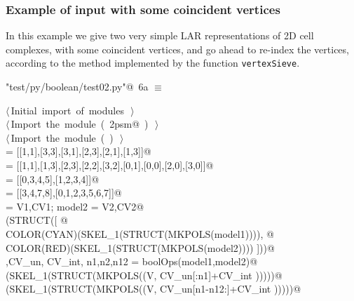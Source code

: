 \documentclass[11pt,oneside]{article}	%
\begin{document}
\subsubsection{Example of input with some coincident vertices}
In this example we give two very simple LAR representations of 2D cell complexes, with some coincident vertices, and go ahead to re-index the vertices, according to the method implemented by the function \texttt{vertexSieve}.

\begin{flushleft} \small
\begin{minipage}{\linewidth} \label{scrap9}
\protect{}\verb@"test/py/boolean/test02.py"@\nobreak\ {\footnotesize 6a }$\equiv$
\vspace{-1ex}
\begin{list}{}{} \item
\mbox{}\verb@@\hbox{$\langle\,$Initial import of modules\nobreak\ {\footnotesize {}}$\,\rangle$}\verb@@\\
\mbox{}\verb@@\hbox{$\langle\,$Import the module\nobreak\ ({\footnotesize {}\label{scrap10}
 }\mbox{}\verb@lar2psm@ ) {\footnotesize {}}$\,\rangle$}\verb@@\\
\mbox{}\verb@@\hbox{$\langle\,$Import the module\nobreak\ ({\footnotesize {}\label{scrap11}
 }\mbox{}\verb@boolean@ ) {\footnotesize {}}$\,\rangle$}\verb@@\\
\mbox{} = [[1,1],[3,3],[3,1],[2,3],[2,1],[1,3]]@\\
\mbox{} = [[1,1],[1,3],[2,3],[2,2],[3,2],[0,1],[0,0],[2,0],[3,0]]@\\
\mbox{} = [[0,3,4,5],[1,2,3,4]]@\\
\mbox{} = [[3,4,7,8],[0,1,2,3,5,6,7]]@\\
\mbox{} = V1,CV1; model2 = V2,CV2@\\
\mbox{}\verb@VIEW(STRUCT([ @\\
\mbox{}\verb@   COLOR(CYAN)(SKEL_1(STRUCT(MKPOLS(model1)))), @\\
\mbox{}\verb@   COLOR(RED)(SKEL_1(STRUCT(MKPOLS(model2)))) ]))@\\
\mbox{}\verb@V,CV_un, CV_int, n1,n2,n12 = boolOps(model1,model2)@\\
\mbox{}\verb@VIEW(SKEL_1(STRUCT(MKPOLS((V, CV_un[:n1]+CV_int )))))@\\
\mbox{}\verb@VIEW(SKEL_1(STRUCT(MKPOLS((V, CV_un[n1-n12:]+CV_int )))))@\\
\mbox{}\verb@@{\NWsep}
\end{list}
\vspace{-2ex}
\end{minipage}\\[4ex]
\end{flushleft}
\end{document}
